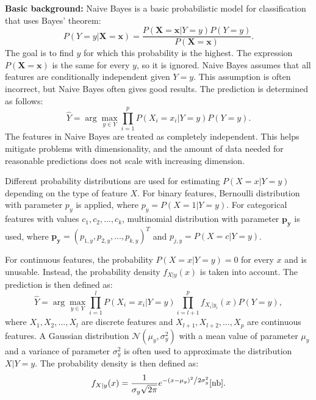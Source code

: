 \documentclass[thesis=M,english]{FITthesis}[2019/12/23]
\begin{document}
\noindent \textbf{Basic background:} Naive Bayes is a basic probabilistic model for classification that uses Bayes' theorem: $$P(Y = y | \boldsymbol{X} = \boldsymbol{x}) = \frac{P(\boldsymbol{X} = \boldsymbol{x} | Y = y)P(Y = y)}{P(\boldsymbol{X} = \boldsymbol{x})}.$$ The goal is to find $y$ for which this probability is the highest. The expression $P(\boldsymbol{X} = \boldsymbol{x})$ is the same for every $y$, so it is ignored. Naive Bayes assumes that all features are conditionally independent given $Y=y$. This assumption is often incorrect, but Naive Bayes often gives good results. The prediction is determined as follows: $$\hat{Y} = \arg \max_{y \in Y} \prod_{i = 1}^p P(X_i = x_i | Y = y)P(Y = y).$$ The features in Naive Bayes are treated as completely independent. This helps mitigate problems with dimensionality, and the amount of data needed for reasonable predictions does not scale with increasing dimension.

Different probability distributions are used for estimating $P(X = x | Y = y)$ depending on the type of feature $X$. For binary features, Bernoulli distribution with parameter $p_y$ is applied, where $p_y = P(X = 1 | Y = y)$. For categorical features with values $c_1, c_2, \dots, c_k$, multinomial distribution with parameter $\boldsymbol{p_y}$ is used, where $\boldsymbol{p_y} = (p_{1, y}, p_{2, y}, \dots, p_{k, y})^T$ and $p_{j, y} = P(X = c | Y = y)$.

For continuous features, the probability $P(X = x | Y = y) = 0$ for every $x$ and is unusable. Instead, the probability density $f_{X|y}(x)$ is taken into account. The prediction is then defined as: $$\hat{Y} = \arg \max_{y \in Y} \prod_{i = 1}^l P(X_i = x_i | Y = y) \prod_{i = l + 1}^p f_{X_i|y_i}(x)P(Y = y),$$ where $X_1, X_2, \dots, X_l$ are discrete features and $X_{l + 1}, X_{l + 2}, \dots, X_p$ are continuous features. A Gaussian distribution $\mathcal{N}(\mu_y, \sigma_y^{2})$ with a mean value of parameter $\mu_y$ and a variance of parameter $\sigma^2_y$ is often used to approximate the distribution $X | Y = y$. The probability density is then defined as: $$f_{X|y}(x) = \frac{1}{{\sigma_y \sqrt {2\pi } }}e^{{{ - \left( {x - \mu_y } \right)^2 } \mathord{\left/ {\vphantom {{ - \left( {x - \mu_y } \right)^2 } {2\sigma_y^2 }}} \right. \kern-\nulldelimiterspace} {2\sigma_y^2 }}} \cite{nb}.$$
\end{document}
